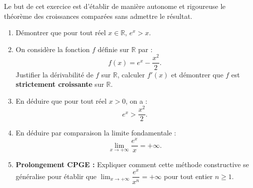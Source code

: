 \documentclass[11pt,a4paper]{article}
\newcommand{\R}{\mathbb{R}}
\begin{document}
Le but de cet exercice est d'établir de manière autonome et rigoureuse le théorème des croissances comparées sans admettre le résultat.
\begin{enumerate}[label=\textbf{\arabic*.}]
    \item Démontrer que pour tout réel $x \in \R$, $e^x > x$.
    \item On considère la fonction $f$ définie sur $\R$ par :
    \[
    f(x) = e^x - \frac{x^2}{2}.
    \]
    Justifier la dérivabilité de $f$ sur $\R$, calculer $f'(x)$ et démontrer que $f$ est \textbf{strictement croissante} sur $\R$.
    \item En déduire que pour tout réel $x > 0$, on a :
    \[
    e^x > \frac{x^2}{2}.
    \]
    \item En déduire par comparaison la limite fondamentale :
    \[
    \lim_{x \to +\infty} \frac{e^x}{x} = +\infty.
    \]
    \item \textbf{Prolongement CPGE :} Expliquer comment cette méthode constructive se généralise pour établir que $\lim_{x \to +\infty} \dfrac{e^x}{x^n} = +\infty$ pour tout entier $n \ge 1$.
\end{enumerate}
\end{document}
